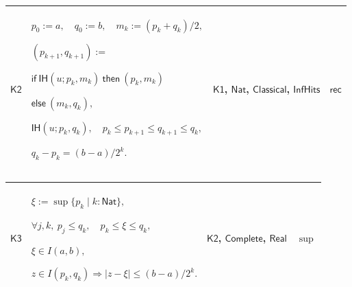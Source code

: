 \documentclass[11pt]{amsart}
\newlength{\FTCFourColumnBody}
\begin{document}
{\begin{tabular}
\end{tabular}%
\par\setlength{\parskip}{0pt}\nointerlineskip
\noindent
\begin{tabular}{|@{}>{\centering\arraybackslash}m{0.078431\FTCFourColumnBody}|>{\centering\arraybackslash}m{0.535947\FTCFourColumnBody}|>{\centering\arraybackslash}m{0.281045\FTCFourColumnBody}|>{\centering\arraybackslash}m{0.104575\FTCFourColumnBody}|}\hline
\hypertarget{proof:K2}{$\displaystyle \textsf{K2}$} & $\displaystyle p_0:=a,\quad q_0:=b,\quad m_k:=(p_k+q_k)/2,$\par
$\displaystyle (p_{k+1},q_{k+1}):=$\par
$\displaystyle \textsf{if}\ \textsf{IH}(u;p_k,m_k)\ \textsf{then}\ (p_k,m_k)$\par
$\displaystyle \textsf{else}\ (m_k,q_k),$\par
$\displaystyle \textsf{IH}(u;p_k,q_k),\quad p_k\le p_{k+1}\le q_{k+1}\le q_k,$\par
$\displaystyle q_k-p_k=(b-a)/2^k.$ & \hyperlink{proof:K1}{$\displaystyle \textsf{K1}$}, \hyperlink{ax:Nat}{$\displaystyle \textsf{Nat}$}, \hyperlink{ax:Classical}{$\displaystyle \textsf{Classical}$}, \hyperlink{def:InfHits}{$\displaystyle \textsf{InfHits}$} & $\displaystyle \textsf{rec}$\\ \hline
\end{tabular}%
\par\setlength{\parskip}{0pt}\nointerlineskip
\noindent
\begin{tabular}{|@{}>{\centering\arraybackslash}m{0.078431\FTCFourColumnBody}|>{\centering\arraybackslash}m{0.535947\FTCFourColumnBody}|>{\centering\arraybackslash}m{0.281045\FTCFourColumnBody}|>{\centering\arraybackslash}m{0.104575\FTCFourColumnBody}|}\hline
\hypertarget{proof:K3}{$\displaystyle \textsf{K3}$} & $\displaystyle \xi:=\sup\{p_k\mid k:\textsf{Nat}\},$\par
$\displaystyle \forall j,k,\ p_j\le q_k,\quad p_k\le\xi\le q_k,$\par
$\displaystyle \xi\in I(a,b),$\par
$\displaystyle z\in I(p_k,q_k)\Rightarrow|z-\xi|\le(b-a)/2^k.$ & \hyperlink{proof:K2}{$\displaystyle \textsf{K2}$}, \hyperlink{ax:Complete}{$\displaystyle \textsf{Complete}$}, \hyperlink{ax:Real}{$\displaystyle \textsf{Real}$} & $\displaystyle \sup$\\ \hline
\end{tabular}%
\par\setlength{\parskip}{0pt}\nointerlineskip
\noindent
\begin{tabular}{|@{}>{\centering\arraybackslash}m{0.078431\FTCFourColumnBody}|>{\centering\arraybackslash}m{0.535947\FTCFourColumnBody}|>{\centering\arraybackslash}m{0.281045\FTCFourColumnBody}|>{\centering\arraybackslash}m{0.104575\FTCFourColumnBody}|}\hline

\end{tabular}}
\end{document}
